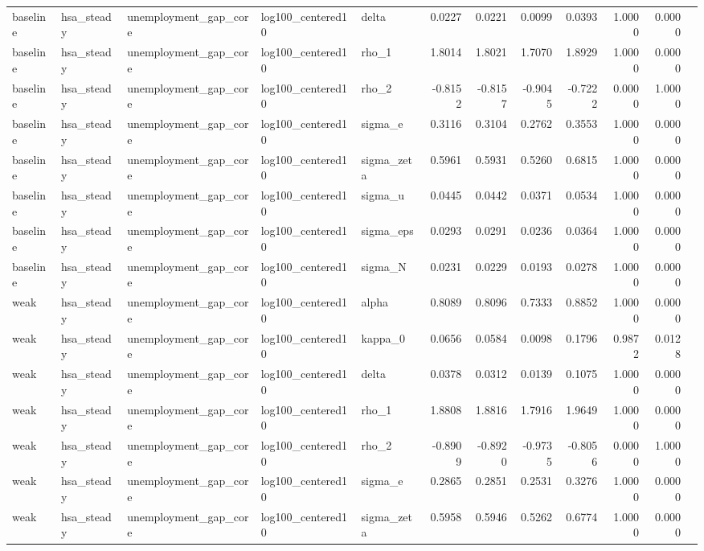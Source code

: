 \begin{tabular}{lllllrrrrrrl}
baseline & hsa\_steady & unemployment\_gap\_core & log100\_centered10 & delta & 0.0227 & 0.0221 & 0.0099 & 0.0393 & 1.0000 & 0.0000 &  \\
baseline & hsa\_steady & unemployment\_gap\_core & log100\_centered10 & rho\_1 & 1.8014 & 1.8021 & 1.7070 & 1.8929 & 1.0000 & 0.0000 &  \\
baseline & hsa\_steady & unemployment\_gap\_core & log100\_centered10 & rho\_2 & -0.8152 & -0.8157 & -0.9045 & -0.7222 & 0.0000 & 1.0000 &  \\
baseline & hsa\_steady & unemployment\_gap\_core & log100\_centered10 & sigma\_e & 0.3116 & 0.3104 & 0.2762 & 0.3553 & 1.0000 & 0.0000 &  \\
baseline & hsa\_steady & unemployment\_gap\_core & log100\_centered10 & sigma\_zeta & 0.5961 & 0.5931 & 0.5260 & 0.6815 & 1.0000 & 0.0000 &  \\
baseline & hsa\_steady & unemployment\_gap\_core & log100\_centered10 & sigma\_u & 0.0445 & 0.0442 & 0.0371 & 0.0534 & 1.0000 & 0.0000 &  \\
baseline & hsa\_steady & unemployment\_gap\_core & log100\_centered10 & sigma\_eps & 0.0293 & 0.0291 & 0.0236 & 0.0364 & 1.0000 & 0.0000 &  \\
baseline & hsa\_steady & unemployment\_gap\_core & log100\_centered10 & sigma\_N & 0.0231 & 0.0229 & 0.0193 & 0.0278 & 1.0000 & 0.0000 &  \\
weak & hsa\_steady & unemployment\_gap\_core & log100\_centered10 & alpha & 0.8089 & 0.8096 & 0.7333 & 0.8852 & 1.0000 & 0.0000 &  \\
weak & hsa\_steady & unemployment\_gap\_core & log100\_centered10 & kappa\_0 & 0.0656 & 0.0584 & 0.0098 & 0.1796 & 0.9872 & 0.0128 &  \\
weak & hsa\_steady & unemployment\_gap\_core & log100\_centered10 & delta & 0.0378 & 0.0312 & 0.0139 & 0.1075 & 1.0000 & 0.0000 &  \\
weak & hsa\_steady & unemployment\_gap\_core & log100\_centered10 & rho\_1 & 1.8808 & 1.8816 & 1.7916 & 1.9649 & 1.0000 & 0.0000 &  \\
weak & hsa\_steady & unemployment\_gap\_core & log100\_centered10 & rho\_2 & -0.8909 & -0.8920 & -0.9735 & -0.8056 & 0.0000 & 1.0000 &  \\
weak & hsa\_steady & unemployment\_gap\_core & log100\_centered10 & sigma\_e & 0.2865 & 0.2851 & 0.2531 & 0.3276 & 1.0000 & 0.0000 &  \\
weak & hsa\_steady & unemployment\_gap\_core & log100\_centered10 & sigma\_zeta & 0.5958 & 0.5946 & 0.5262 & 0.6774 & 1.0000 & 0.0000 &  \\

\end{tabular}
